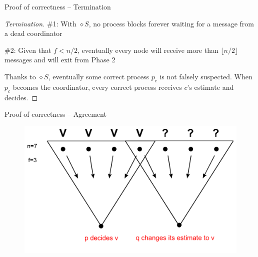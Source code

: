 \begin{frame}{Proof of correctness -- Termination}

\begin{proof}[Termination]	
\BI
\item \WAIT \#1: With $\diamond S$, no process blocks forever waiting for a message 
  from a dead coordinator
\item \WAIT \#2: Given that $f<n/2$, eventually every node will receive more
than $\lfloor n/2 \rfloor$ messages and will exit from Phase 2
\item Thanks to $\diamond S$, eventually some correct process $p_c$ is not falsely 
  suspected. When $p_c$ becomes the coordinator, every correct process receives $c$'s 
  estimate and decides.
\EI
\end{proof}

\end{frame}


\begin{frame}{Proof of correctness -- Agreement}


\begin{figure}
	\includegraphics[width=\textwidth]{agreement}
\end{figure}

\end{frame}

